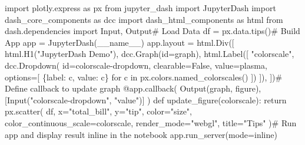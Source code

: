 \documentclass[
  letterpaper,
  DIV=11,
  numbers=noendperiod]{scrartcl}
\newenvironment{Shaded}{\begin{snugshade}}{\end{snugshade}}
\newcommand{\AttributeTok}[1]{\textcolor[rgb]{0.40,0.45,0.13}{#1}}
\newcommand{\BuiltInTok}[1]{\textcolor[rgb]{0.00,0.23,0.31}{#1}}
\newcommand{\CommentTok}[1]{\textcolor[rgb]{0.37,0.37,0.37}{#1}}
\newcommand{\ControlFlowTok}[1]{\textcolor[rgb]{0.00,0.23,0.31}{#1}}
\newcommand{\ImportTok}[1]{\textcolor[rgb]{0.00,0.46,0.62}{#1}}
\newcommand{\KeywordTok}[1]{\textcolor[rgb]{0.00,0.23,0.31}{#1}}
\newcommand{\NormalTok}[1]{\textcolor[rgb]{0.00,0.23,0.31}{#1}}
\newcommand{\OperatorTok}[1]{\textcolor[rgb]{0.37,0.37,0.37}{#1}}
\newcommand{\StringTok}[1]{\textcolor[rgb]{0.13,0.47,0.30}{#1}}
\newcommand{\VariableTok}[1]{\textcolor[rgb]{0.07,0.07,0.07}{#1}}
\begin{document}
\begin{Shaded}
\begin{Highlighting}[]
\ImportTok{import}\NormalTok{ plotly.express }\ImportTok{as}\NormalTok{ px}
\ImportTok{from}\NormalTok{ jupyter\_dash }\ImportTok{import}\NormalTok{ JupyterDash}
\ImportTok{import}\NormalTok{ dash\_core\_components }\ImportTok{as}\NormalTok{ dcc}
\ImportTok{import}\NormalTok{ dash\_html\_components }\ImportTok{as}\NormalTok{ html}
\ImportTok{from}\NormalTok{ dash.dependencies }\ImportTok{import}\NormalTok{ Input, Output}\CommentTok{\# Load Data}
\NormalTok{df }\OperatorTok{=}\NormalTok{ px.data.tips()}\CommentTok{\# Build App}
\NormalTok{app }\OperatorTok{=}\NormalTok{ JupyterDash(}\VariableTok{\_\_name\_\_}\NormalTok{)}
\NormalTok{app.layout }\OperatorTok{=}\NormalTok{ html.Div([}
\NormalTok{    html.H1(}\StringTok{"JupyterDash Demo"}\NormalTok{),}
\NormalTok{    dcc.Graph(}\BuiltInTok{id}\OperatorTok{=}\StringTok{\textquotesingle{}graph\textquotesingle{}}\NormalTok{),}
\NormalTok{    html.Label([}
        \StringTok{"colorscale"}\NormalTok{,}
\NormalTok{        dcc.Dropdown(}
            \BuiltInTok{id}\OperatorTok{=}\StringTok{\textquotesingle{}colorscale{-}dropdown\textquotesingle{}}\NormalTok{, clearable}\OperatorTok{=}\VariableTok{False}\NormalTok{,}
\NormalTok{            value}\OperatorTok{=}\StringTok{\textquotesingle{}plasma\textquotesingle{}}\NormalTok{, options}\OperatorTok{=}\NormalTok{[}
\NormalTok{                \{}\StringTok{\textquotesingle{}label\textquotesingle{}}\NormalTok{: c, }\StringTok{\textquotesingle{}value\textquotesingle{}}\NormalTok{: c\}}
                \ControlFlowTok{for}\NormalTok{ c }\KeywordTok{in}\NormalTok{ px.colors.named\_colorscales()}
\NormalTok{            ])}
\NormalTok{    ]),}
\NormalTok{])}\CommentTok{\# Define callback to update graph}
\AttributeTok{@app.callback}\NormalTok{(}
\NormalTok{    Output(}\StringTok{\textquotesingle{}graph\textquotesingle{}}\NormalTok{, }\StringTok{\textquotesingle{}figure\textquotesingle{}}\NormalTok{),}
\NormalTok{    [Input(}\StringTok{"colorscale{-}dropdown"}\NormalTok{, }\StringTok{"value"}\NormalTok{)]}
\NormalTok{)}
\KeywordTok{def}\NormalTok{ update\_figure(colorscale):}
    \ControlFlowTok{return}\NormalTok{ px.scatter(}
\NormalTok{        df, x}\OperatorTok{=}\StringTok{"total\_bill"}\NormalTok{, y}\OperatorTok{=}\StringTok{"tip"}\NormalTok{, color}\OperatorTok{=}\StringTok{"size"}\NormalTok{,}
\NormalTok{        color\_continuous\_scale}\OperatorTok{=}\NormalTok{colorscale,}
\NormalTok{        render\_mode}\OperatorTok{=}\StringTok{"webgl"}\NormalTok{, title}\OperatorTok{=}\StringTok{"Tips"}
\NormalTok{    )}\CommentTok{\# Run app and display result inline in the notebook}
\NormalTok{app.run\_server(mode}\OperatorTok{=}\StringTok{\textquotesingle{}inline\textquotesingle{}}\NormalTok{)}
\end{Highlighting}
\end{Shaded}
\end{document}
